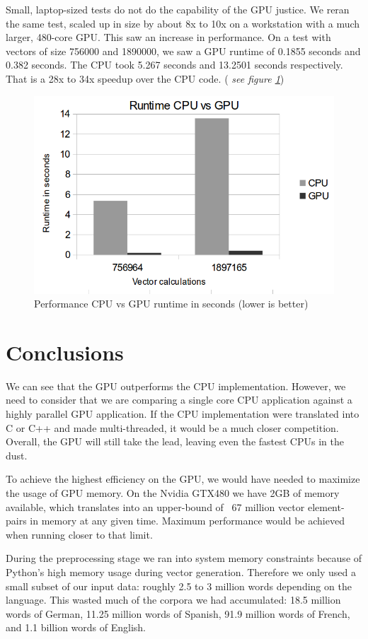 \documentclass[12pt]{article}
\begin{document}
Small, laptop-sized tests do not do the capability of the GPU justice. We reran the same test, scaled up in size by about 8x to 10x on a workstation with a much larger, 480-core GPU. This saw an increase in performance. On a test with vectors of size 756000 and 1890000, we saw a GPU runtime of 0.1855 seconds and 0.382 seconds. The CPU took 5.267 seconds and 13.2501 seconds respectively. That is a 28x to 34x speedup over the CPU code. (\emph{ see figure \ref{graph}})
\begin{figure}[htb]
\centering
\includegraphics[scale=.5]{graph.png}
\caption{Performance CPU vs GPU runtime in seconds (lower is better)}
  \label{graph}
\end{figure}

\section{Conclusions}
We can see that the GPU outperforms the CPU implementation. However, we need to consider that we are comparing a single core CPU application against a highly parallel GPU application. If the CPU implementation were translated into C or C++ and made multi-threaded, it would be a much closer competition. Overall, the GPU will still take the lead, leaving even the fastest CPUs in the dust.

To achieve the highest efficiency on the GPU, we would have needed to maximize the usage of GPU memory. On the Nvidia GTX480 we have 2GB of memory available, which translates into an upper-bound of ~67 million vector element-pairs in memory at any given time. Maximum performance would be achieved when running closer to that limit.

During the preprocessing stage we ran into system memory constraints because of Python's high memory usage during vector generation. Therefore we only used a small subset of our input data: roughly 2.5 to 3 million words depending on the language. This wasted much of the corpora we had accumulated: 18.5 million words of German, 11.25 million words of Spanish, 91.9 million words of French, and 1.1 billion words of English.
\end{document}
